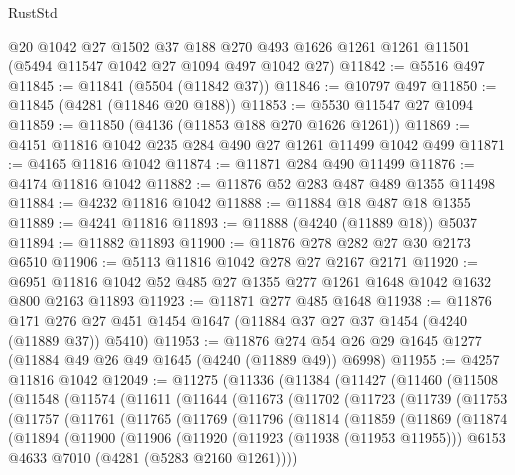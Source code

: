 \begin{lexlean}{RustStd}
\begin{coremodule}
    @20
    @1042
    @27
    @1502
    @37
    @188
    @270
    @493
    @1626
    @1261
    @1261
    @11501
    (@5494 @11547 @1042 @27 @1094 @497 @1042 @27)
@11842 := @5516 @497
@11845 := @11841 (@5504 (@11842 @37))
@11846 := @10797 @497
@11850 := @11845 (@4281 (@11846 @20 @188))
@11853 := @5530 @11547 @27 @1094
@11859 := @11850 (@4136 (@11853 @188 @270 @1626 @1261))
@11869 := @4151 @11816 @1042 @235 @284 @490 @27 @1261 @11499 @1042 @499
@11871 := @4165 @11816 @1042
@11874 := @11871 @284 @490 @11499
@11876 := @4174 @11816 @1042
@11882 := @11876 @52 @283 @487 @489 @1355 @11498
@11884 := @4232 @11816 @1042
@11888 := @11884 @18 @487 @18 @1355
@11889 := @4241 @11816
@11893 := @11888 (@4240 (@11889 @18)) @5037
@11894 := @11882 @11893
@11900 := @11876 @278 @282 @27 @30 @2173 @6510
@11906 := @5113 @11816 @1042 @278 @27 @2167 @2171
@11920 := @6951 @11816 @1042 @52 @485 @27 @1355 @277 @1261 @1648 @1042 @1632 @800 @2163 @11893
@11923 := @11871 @277 @485 @1648
@11938 := @11876
    @171
    @276
    @27
    @451
    @1454
    @1647
    (@11884 @37 @27 @37 @1454 (@4240 (@11889 @37)) @5410)
@11953 := @11876 @274 @54 @26 @29 @1645 @1277 (@11884 @49 @26 @49 @1645 (@4240 (@11889 @49)) @6998)
@11955 := @4257 @11816 @1042
@12049 := @11275
    (@11336
      (@11384
        (@11427
          (@11460
            (@11508
              (@11548
                (@11574
                  (@11611
                    (@11644
                      (@11673
                        (@11702
                          (@11723
                            (@11739
                              (@11753
                                (@11757
                                  (@11761
                                    (@11765
                                      (@11769
                                        (@11796
                                          (@11814
                                            (@11859
                                              (@11869
                                                (@11874
                                                  (@11894
                                                    (@11900
                                                      (@11906
                                                        (@11920
                                                          (@11923 (@11938 (@11953 @11955)))
                                                          @6153
                                                          @4633
                                                          @7010
                                                          (@4281 (@5283 @2160 @1261))))

\end{coremodule}
\end{lexlean}
